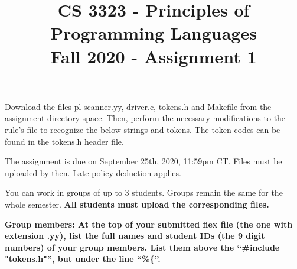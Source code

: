 \documentclass[letter,11pt]{article}
\title{CS 3323 - Principles of Programming Languages\\Fall 2020 - Assignment 1}
\date{}
\begin{document}
\vspace{-1in}
\maketitle

Download the files pl-scanner.yy, driver.c, tokens.h and Makefile from the assignment directory space. Then, perform the necessary modifications
to the rule's file to recognize the below strings and tokens. The token codes can be found in the tokens.h header file.

The assignment is due on September 25th, 2020, 11:59pm CT. Files must be uploaded by then. Late policy deduction applies.

You can work in groups of up to 3 students. Groups remain the same for the whole semester. {\bf All students must upload the corresponding files.}

{\bf Group members: At the top of your submitted flex file (the one with extension .yy), list the full names and student IDs (the 9 digit numbers)
of your group members. List them above the ``\#include "tokens.h"'',  but under the line ``\%\{''.}
\end{document}

